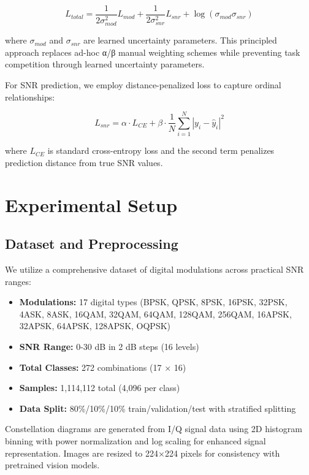 \documentclass{ELSP}
\begin{document}
{{\begin{equation}
L_{total} = \frac{1}{2\sigma_{mod}^2} L_{mod} + \frac{1}{2\sigma_{snr}^2} L_{snr} + \log(\sigma_{mod}\sigma_{snr})
\end{equation}

where $\sigma_{mod}$ and $\sigma_{snr}$ are learned uncertainty parameters. This principled approach replaces ad-hoc α/β manual weighting schemes while preventing task competition through learned uncertainty parameters.

For SNR prediction, we employ distance-penalized loss to capture ordinal relationships:

\begin{equation}
L_{snr} = \alpha \cdot L_{CE} + \beta \cdot \frac{1}{N} \sum_{i=1}^{N} |y_i - \hat{y}_i|^2
\end{equation}

where $L_{CE}$ is standard cross-entropy loss and the second term penalizes prediction distance from true SNR values.

\section{Experimental Setup}

\subsection{Dataset and Preprocessing}

We utilize a comprehensive dataset of digital modulations across practical SNR ranges:
\begin{itemize}
    \item \textbf{Modulations:} 17 digital types (BPSK, QPSK, 8PSK, 16PSK, 32PSK, 4ASK, 8ASK, 16QAM, 32QAM, 64QAM, 128QAM, 256QAM, 16APSK, 32APSK, 64APSK, 128APSK, OQPSK)
    \item \textbf{SNR Range:} 0-30 dB in 2 dB steps (16 levels)
    \item \textbf{Total Classes:} 272 combinations (17 × 16)
    \item \textbf{Samples:} 1,114,112 total (4,096 per class)
    \item \textbf{Data Split:} 80\%/10\%/10\% train/validation/test with stratified splitting
\end{itemize}

Constellation diagrams are generated from I/Q signal data using 2D histogram binning with power normalization and log scaling for enhanced signal representation. Images are resized to 224×224 pixels for consistency with pretrained vision models.

}}
\end{document}
